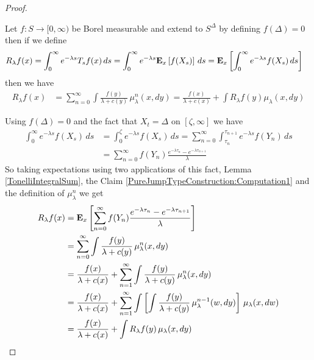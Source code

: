 \begin{proof}
\begin{clm}\label{PureJumpTypeConstruction:ResolventIdentity} Let $f : S \to [0,\infty)$ be Borel measurable and extend to $S^\Delta$ by defining $f(\Delta) = 0$ then if we define
\begin{align*}
R_\lambda f (x) &= \int_0^\infty e^{-\lambda s} T_s f(x) \, ds = \int_0^\infty e^{-\lambda s} \sexpectation{f(X_s)}{x}  \, ds = \sexpectation{\int_0^\infty e^{-\lambda s} f(X_s) \, ds }{x} 
\end{align*}
then we have 
\begin{align*}
R_\lambda f(x) &= \sum_{n=0}^\infty \int \frac{f(y)}{\lambda + c(y)} \, \mu_\lambda^n(x, dy) = \frac{f(x)}{\lambda + c(x)} + \int R_\lambda f(y) \mu_\lambda(x,dy)
\end{align*}
\end{clm}
Using $f(\Delta) = 0$ and the fact that $X_t=\Delta$ on $[\zeta, \infty]$ we have 
\begin{align*}
\int_0^\infty e^{-\lambda s} f(X_s) \, ds 
&=\int_0^\zeta e^{-\lambda s} f(X_s) \, ds 
= \sum_{n=0}^\infty \int_{\tau_n}^{\tau_{n+1}} e^{-\lambda s} f(Y_n) \, ds \\
&= \sum_{n=0}^\infty f(Y_n) \frac{e^{-\lambda \tau_n} - e^{-\lambda \tau_{n+1}}}{\lambda}
\end{align*}
So taking expectations using two applications of this fact, Lemma \ref{TonelliIntegralSum}, the Claim \ref{PureJumpTypeConstruction:Computation1} and the definition of $\mu_\lambda^n$ we get
\begin{align*}
R_\lambda f(x) 
&= \sexpectation{\sum_{n=0}^\infty f(Y_n) \frac{e^{-\lambda \tau_n} - e^{-\lambda \tau_{n+1}}}{\lambda}}{x} \\
&= \sum_{n=0}^\infty \int \frac{f(y)}{\lambda + c(y)} \, \mu_\lambda^n(x, dy) \\
&= \frac{f(x)}{\lambda + c(x)} + \sum_{n=1}^\infty \int \frac{f(y)}{\lambda + c(y)} \, \mu_\lambda^n(x, dy) \\
&= \frac{f(x)}{\lambda + c(x)} + \sum_{n=1}^\infty \int \left [ \int \frac{f(y)}{\lambda + c(y)} \, \mu_\lambda^{n-1}(w, dy) \right ] \, \mu_\lambda(x,dw) \\
&= \frac{f(x)}{\lambda + c(x)} + \int R_\lambda f (y) \, \mu_\lambda(x,dy) \\
\end{align*}


\end{proof}
